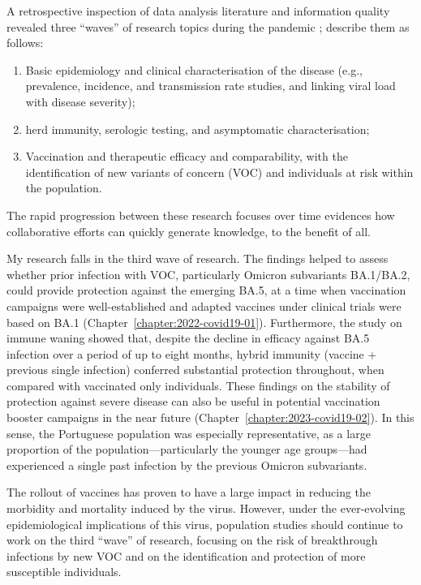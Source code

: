 A retrospective inspection of \covid data analysis literature and information quality revealed three ``waves'' of research topics during the pandemic \citep{serio2022ReproducibilityCOVID19};
\citet{westermeier2023EditorialReproducibility} describe them as follows:
% 
\begin{enumerate}
    \setlength{\itemsep}{1.5pt}
    \setlength{\parskip}{0pt}
    \setlength{\parsep}{0pt}
    \item Basic epidemiology and clinical characterisation of the disease (e.g., prevalence, incidence, and transmission rate studies, and linking viral load with disease severity);
    \item \covid herd immunity, serologic testing, and asymptomatic characterisation;
    \item Vaccination and therapeutic efficacy and comparability, with the identification of new variants of concern (VOC) and individuals at risk within the population.
\end{enumerate}
% 
The rapid progression between these research focuses over time evidences how collaborative efforts can quickly generate knowledge, to the benefit of all.

My research falls in the third wave of research.
The findings helped to assess whether prior infection with \sars VOC, particularly Omicron subvariants BA.1/BA.2, could provide protection against the emerging BA.5, at a time when vaccination campaigns were well-established and adapted vaccines under clinical trials were based on BA.1 (Chapter~\ref{chapter:2022-covid19-01}).
Furthermore, the study on immune waning showed that, despite the decline in efficacy against BA.5 infection over a period of up to eight months, hybrid immunity (vaccine + previous single infection) conferred substantial protection throughout, when compared with vaccinated only individuals.
These findings on the stability of protection against severe disease can also be useful in potential vaccination booster campaigns in the near future (Chapter~\ref{chapter:2023-covid19-02}).
In this sense, the Portuguese population was especially representative, as a large proportion of the population---particularly the younger age groups---had experienced a single past infection by the previous Omicron subvariants.

The rollout of \covid vaccines has proven to have a large impact in reducing the morbidity and mortality induced by the \sars virus.
However, under the ever-evolving epidemiological implications of this virus, population studies should continue to work on the third ``wave'' of research, focusing on the risk of breakthrough infections by new VOC and on the identification and protection of more susceptible individuals.

